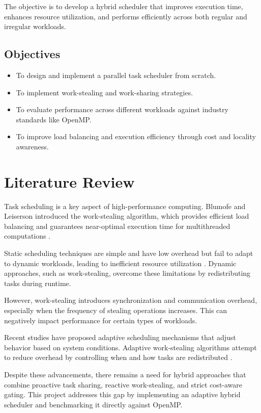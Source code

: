 \documentclass[12pt,a4paper]{article}
\begin{document}
The objective is to develop a hybrid scheduler that improves execution time, enhances resource utilization, and performs efficiently across both regular and irregular workloads.
\newpage
\subsection{Objectives}

\begin{itemize}
\item To design and implement a parallel task scheduler from scratch.
\item To implement work-stealing and work-sharing strategies.
\item To evaluate performance across different workloads against industry standards like OpenMP.
\item To improve load balancing and execution efficiency through cost and locality awareness.
\end{itemize}

\section{Literature Review}
Task scheduling is a key aspect of high-performance computing. Blumofe and Leiserson introduced the work-stealing algorithm, which provides efficient load balancing and guarantees near-optimal execution time for multithreaded computations \cite{blumofe1999scheduling}.

Static scheduling techniques are simple and have low overhead but fail to adapt to dynamic workloads, leading to inefficient resource utilization \cite{quinn2004parallel}. Dynamic approaches, such as work-stealing, overcome these limitations by redistributing tasks during runtime.

However, work-stealing introduces synchronization and communication overhead, especially when the frequency of stealing operations increases. This can negatively impact performance for certain types of workloads.

Recent studies have proposed adaptive scheduling mechanisms that adjust behavior based on system conditions. Adaptive work-stealing algorithms attempt to reduce overhead by controlling when and how tasks are redistributed \cite{agrawal2010adaptive}.

Despite these advancements, there remains a need for hybrid approaches that combine proactive task sharing, reactive work-stealing, and strict cost-aware gating. This project addresses this gap by implementing an adaptive hybrid scheduler and benchmarking it directly against OpenMP.
\end{document}
